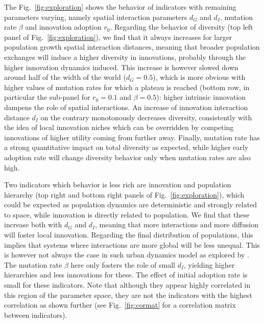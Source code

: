 \documentclass[letterpaper]{article}
\begin{document}
The Fig.~\ref{fig:exploration} shows the behavior of indicators with remaining parameters varying, namely spatial interaction parameters $d_G$ and $d_I$, mutation rate $\beta$ and innovation adoption $r_0$. Regarding the behavior of diversity (top left panel of Fig.~\ref{fig:exploration}), we find that it always increases for larger population growth spatial interaction distances, meaning that broader population exchanges will induce a higher diversity in innovations, probably through the higher innovation dynamics induced. This increase is however slowed down around half of the width of the world ($d_G = 0.5$), which is more obvious with higher values of mutation rates for which a plateau is reached (bottom row, in particular the sub-panel for $r_0=0.1$ and $\beta = 0.5$): higher intrinsic innovation dampens the role of spatial interactions. An increase of innovation interaction distance $d_I$ on the contrary monotonously decreases diversity, consistently with the idea of local innovation niches which can be overridden by competing innovations of higher utility coming from further away. Finally, mutation rate has a strong quantitative impact on total diversity as expected, while higher early adoption rate will change diversity behavior only when mutation rates are also high.

Two indicators which behavior is less rich are innovation and population hierarchy (top right and bottom right panels of Fig.~\ref{fig:exploration}), which could be expected as population dynamics are deterministic and strongly related to space, while innovation is directly related to population. We find that these increase both with $d_G$ and $d_I$, meaning that more interactions and more diffusion will foster local innovation. Regarding the final distribution of populations, this implies that systems where interactions are more global will be less unequal. This is however not always the case in such urban dynamics model as explored by \cite{raimbault2020hierarchy}. The mutation rate $\beta$ here only fosters the role of small $d_I$, yielding higher hierarchies and less innovations for these. The effect of initial adoption rate is small for these indicators. Note that although they appear highly correlated in this region of the parameter space, they are not the indicators with the highest correlation as shown further (see Fig.~\ref{fig:cormat} for a correlation matrix between indicators).
\end{document}
